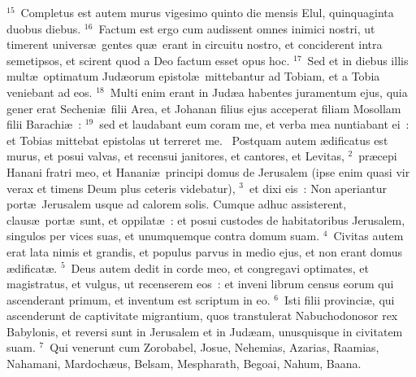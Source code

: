 ${}^{15}$~Completus est autem murus vigesimo quinto die mensis Elul, quinquaginta duobus diebus.
${}^{16}$~Factum est ergo cum audissent omnes inimici nostri, ut timerent univers\ae\ gentes qu\ae\ erant in circuitu nostro, et conciderent intra semetipsos, et scirent quod a Deo factum esset opus hoc.
${}^{17}$~Sed et in diebus illis mult\ae\ optimatum Jud\ae orum epistol\ae\ mittebantur ad Tobiam, et a Tobia veniebant ad eos.
${}^{18}$~Multi enim erant in Jud\ae a habentes juramentum ejus, quia gener erat Secheni\ae\ filii Area, et Johanan filius ejus acceperat filiam Mosollam filii Barachi\ae~:
${}^{19}$~sed et laudabant eum coram me, et verba mea nuntiabant ei~: et Tobias mittebat epistolas ut terreret me.
~Postquam autem \ae dificatus est murus, et posui valvas, et recensui janitores, et cantores, et Levitas,
${}^{2}$~pr\ae cepi Hanani fratri meo, et Hanani\ae\ principi domus de Jerusalem (ipse enim quasi vir verax et timens Deum plus ceteris videbatur),
${}^{3}$~et dixi eis~: Non aperiantur port\ae\ Jerusalem usque ad calorem solis. Cumque adhuc assisterent, claus\ae\ port\ae\ sunt, et oppilat\ae~: et posui custodes de habitatoribus Jerusalem, singulos per vices suas, et unumquemque contra domum suam.
${}^{4}$~Civitas autem erat lata nimis et grandis, et populus parvus in medio ejus, et non erant domus \ae dificat\ae .
${}^{5}$~Deus autem dedit in corde meo, et congregavi optimates, et magistratus, et vulgus, ut recenserem eos~: et inveni librum census eorum qui ascenderant primum, et inventum est scriptum in eo.
${}^{6}$~Isti filii provinci\ae , qui ascenderunt de captivitate migrantium, quos transtulerat Nabuchodonosor rex Babylonis, et reversi sunt in Jerusalem et in Jud\ae am, unusquisque in civitatem suam.
${}^{7}$~Qui venerunt cum Zorobabel, Josue, Nehemias, Azarias, Raamias, Nahamani, Mardoch\ae us, Belsam, Mespharath, Begoai, Nahum, Baana.

